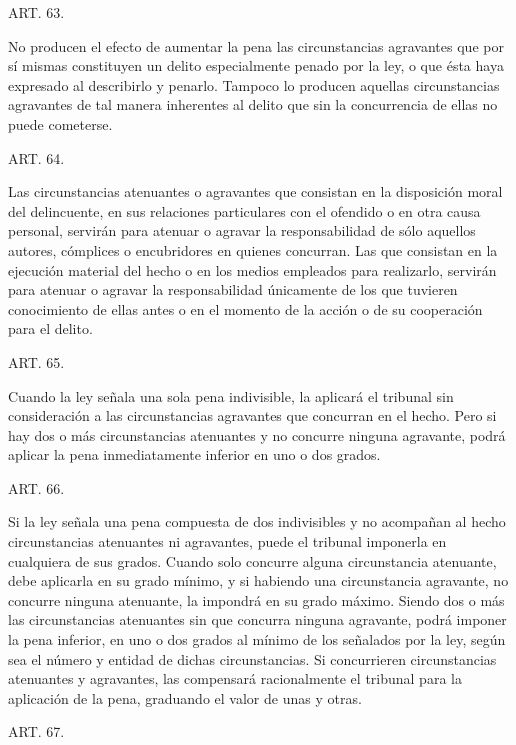     ART. 63.

    No producen el efecto de aumentar la pena las circunstancias agravantes que por sí mismas constituyen un delito especialmente penado por la ley, o que ésta haya expresado al describirlo y penarlo.
    Tampoco lo producen aquellas circunstancias agravantes de tal manera inherentes al delito que sin la concurrencia de ellas no puede cometerse.


    ART. 64.

    Las circunstancias atenuantes o agravantes que consistan en la disposición moral del delincuente, en sus relaciones particulares con el ofendido o en otra causa personal, servirán para atenuar o agravar la responsabilidad de sólo aquellos autores, cómplices o encubridores en quienes concurran.
    Las que consistan en la ejecución material del hecho o en los medios empleados para realizarlo, servirán para atenuar o agravar la responsabilidad únicamente de los que tuvieren conocimiento de ellas antes o en el momento de la acción o de su cooperación para el delito.




    ART. 65.

    Cuando la ley señala una sola pena indivisible, la aplicará el tribunal sin consideración a las circunstancias agravantes que concurran en el hecho. Pero si hay dos o más circunstancias atenuantes y no concurre ninguna agravante, podrá aplicar la pena inmediatamente inferior en uno o dos grados.




    ART. 66.

    Si la ley señala una pena compuesta de dos indivisibles y no acompañan al hecho circunstancias atenuantes ni agravantes, puede el tribunal imponerla en cualquiera de sus grados.
    Cuando solo concurre alguna circunstancia atenuante, debe aplicarla en su grado mínimo, y si habiendo una circunstancia agravante, no concurre ninguna atenuante, la impondrá en su grado máximo.
    Siendo dos o más las circunstancias atenuantes sin que concurra ninguna agravante, podrá imponer la pena inferior, en uno o dos grados al mínimo de los señalados por la ley, según sea el número y entidad de dichas circunstancias.
    Si concurrieren circunstancias atenuantes y agravantes, las compensará racionalmente el tribunal para la aplicación de la pena, graduando el valor de unas y otras.



    ART. 67.


